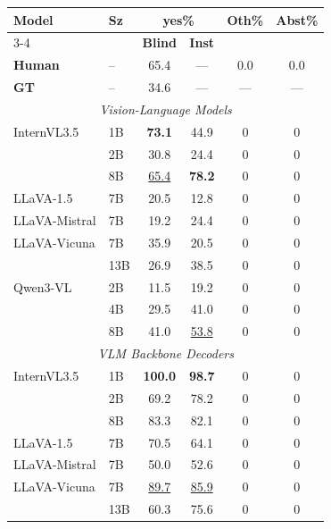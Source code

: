 \begin{table}[h]
\centering
\setlength{\tabcolsep}{4pt}
\renewcommand{\arraystretch}{0.95}
\begin{tabular}{ll cccc}
\toprule
\multirow{2}{*}{\textbf{Model}} & \multirow{2}{*}{\textbf{Sz}} & \multicolumn{2}{c}{\textbf{yes\%}} & \multirow{2}{*}{\textbf{Oth\%}} & \multirow{2}{*}{\textbf{Abst\%}} \\
\cmidrule(lr){3-4}
 & & \textbf{Blind} & \textbf{Inst} & & \\
\midrule
\textbf{Human} & -- & \cellcolor{green!15}65.4 & --- & 0.0 & 0.0 \\
\textbf{GT} & -- & 34.6 & --- & --- & --- \\
\midrule
\multicolumn{6}{c}{\textit{Vision-Language Models}}\\
\midrule
InternVL3.5 & 1B & \cellcolor{green!15}\textbf{73.1} & 44.9 & 0 & 0 \\
 & 2B & 30.8 & 24.4 & 0 & 0 \\
 & 8B & \cellcolor{green!15}\underline{65.4} & \cellcolor{green!15}\textbf{78.2} & 0 & 0 \\
LLaVA-1.5 & 7B & 20.5 & 12.8 & 0 & 0 \\
LLaVA-Mistral & 7B & 19.2 & 24.4 & 0 & 0 \\
LLaVA-Vicuna & 7B & 35.9 & 20.5 & 0 & 0 \\
 & 13B & 26.9 & 38.5 & 0 & 0 \\
Qwen3-VL & 2B & 11.5 & 19.2 & 0 & 0 \\
 & 4B & 29.5 & 41.0 & 0 & 0 \\
 & 8B & 41.0 & \cellcolor{green!15}\underline{53.8} & 0 & 0 \\
\midrule
\multicolumn{6}{c}{\textit{VLM Backbone Decoders}}\\
\midrule
InternVL3.5 & 1B & \cellcolor{green!15}\textbf{100.0} & \cellcolor{green!15}\textbf{98.7} & 0 & 0 \\
 & 2B & \cellcolor{green!15}69.2 & \cellcolor{green!15}78.2 & 0 & 0 \\
 & 8B & \cellcolor{green!15}83.3 & \cellcolor{green!15}82.1 & 0 & 0 \\
LLaVA-1.5 & 7B & \cellcolor{green!15}70.5 & \cellcolor{green!15}64.1 & 0 & 0 \\
LLaVA-Mistral & 7B & 50.0 & \cellcolor{green!15}52.6 & 0 & 0 \\
LLaVA-Vicuna & 7B & \cellcolor{green!15}\underline{89.7} & \cellcolor{green!15}\underline{85.9} & 0 & 0 \\
 & 13B & \cellcolor{green!15}60.3 & \cellcolor{green!15}75.6 & 0 & 0 \\

\end{tabular}
\end{table}
